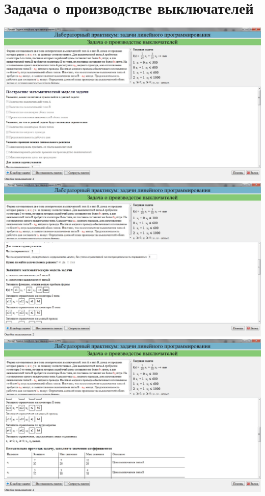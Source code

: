 \section{Задача о производстве выключателей}

\includegraphics[width=\linewidth]{om_hw_02/images/5_1.jpg}\\
\includegraphics[width=\linewidth]{om_hw_02/images/5_2.jpg}\\
\includegraphics[width=\linewidth]{om_hw_02/images/5_3.jpg}\\

